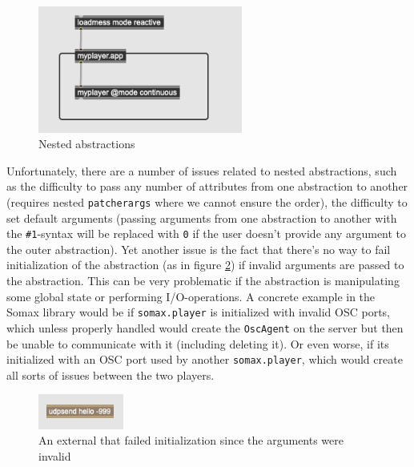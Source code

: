  \begin{figure}[h!]
    \centering        
 	\includegraphics[width=0.6\textwidth, keepaspectratio]{figures/nested-abstractions.png}
    \caption{Nested abstractions}
    \label{fig:3-nested-abstractions}
\end{figure}

\noindent Unfortunately, there are a number of issues related to nested abstractions, such as the difficulty to pass any number of attributes from one abstraction to another (requires nested \texttt{patcherargs} where we cannot ensure the order), the difficulty to set default arguments (passing arguments from one abstraction to another with the \texttt{\#1}-syntax will be replaced with \texttt{0} if the user doesn't provide any argument to the outer abstraction). Yet another issue is the fact that there's no way to fail initialization of the abstraction (as in figure \ref{fig:3-failed-init}) if invalid arguments are passed to the abstraction. This can be very problematic if the abstraction is manipulating some global state or performing I/O-operations. A concrete example in the Somax library would be if \texttt{somax.player} is initialized with invalid OSC ports, which unless properly handled would create the \texttt{OscAgent} on the server but then be unable to communicate with it (including deleting it). Or even worse, if its initialized with an OSC port used by another \texttt{somax.player}, which would create all sorts of issues between the two players.

 \begin{figure}[h!]
    \centering        
 	\includegraphics[width=0.25\textwidth, keepaspectratio]{figures/failed-external.png}
    \caption{An external that failed initialization since the arguments were invalid}
    \label{fig:3-failed-init}
\end{figure}

